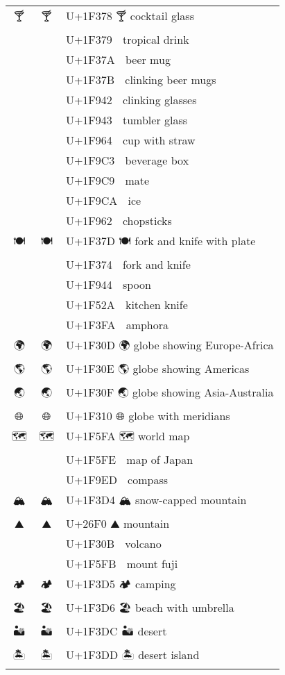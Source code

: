 \documentclass[a4paper,12pt]{article}
\newcommand{\fontA}[1]{{\fontspec[RawFeature={mode=harf,+dist,+ccmp}]{Segoe UI Emoji} #1}}
\newcommand{\fontB}[1]{{\fontspec[RawFeature={mode=harf,+dist,+ccmp}]{Noto Color Emoji} #1}}
\begin{document}
\begin{longtable}[c]{ccp{0.8\linewidth}}
\fontA{🍸}&\fontB{🍸}&U+1F378 🍸 cocktail glass\\
\fontA{🍹}&\fontB{🍹}&U+1F379 🍹 tropical drink\\
\fontA{🍺}&\fontB{🍺}&U+1F37A 🍺 beer mug\\
\fontA{🍻}&\fontB{🍻}&U+1F37B 🍻 clinking beer mugs\\
\fontA{🥂}&\fontB{🥂}&U+1F942 🥂 clinking glasses\\
\fontA{🥃}&\fontB{🥃}&U+1F943 🥃 tumbler glass\\
\fontA{🥤}&\fontB{🥤}&U+1F964 🥤 cup with straw\\
\fontA{🧃}&\fontB{🧃}&U+1F9C3 🧃 beverage box\\
\fontA{🧉}&\fontB{🧉}&U+1F9C9 🧉 mate\\
\fontA{🧊}&\fontB{🧊}&U+1F9CA 🧊 ice\\
\fontA{🥢}&\fontB{🥢}&U+1F962 🥢 chopsticks\\
\fontA{🍽}&\fontB{🍽}&U+1F37D 🍽 fork and knife with plate\\
\fontA{🍴}&\fontB{🍴}&U+1F374 🍴 fork and knife\\
\fontA{🥄}&\fontB{🥄}&U+1F944 🥄 spoon\\
\fontA{🔪}&\fontB{🔪}&U+1F52A 🔪 kitchen knife\\
\fontA{🏺}&\fontB{🏺}&U+1F3FA 🏺 amphora\\
\fontA{🌍}&\fontB{🌍}&U+1F30D 🌍 globe showing Europe-Africa\\
\fontA{🌎}&\fontB{🌎}&U+1F30E 🌎 globe showing Americas\\
\fontA{🌏}&\fontB{🌏}&U+1F30F 🌏 globe showing Asia-Australia\\
\fontA{🌐}&\fontB{🌐}&U+1F310 🌐 globe with meridians\\
\fontA{🗺}&\fontB{🗺}&U+1F5FA 🗺 world map\\
\fontA{🗾}&\fontB{🗾}&U+1F5FE 🗾 map of Japan\\
\fontA{🧭}&\fontB{🧭}&U+1F9ED 🧭 compass\\
\fontA{🏔}&\fontB{🏔}&U+1F3D4 🏔 snow-capped mountain\\
\fontA{⛰}&\fontB{⛰}&U+26F0 ⛰ mountain\\
\fontA{🌋}&\fontB{🌋}&U+1F30B 🌋 volcano\\
\fontA{🗻}&\fontB{🗻}&U+1F5FB 🗻 mount fuji\\
\fontA{🏕}&\fontB{🏕}&U+1F3D5 🏕 camping\\
\fontA{🏖}&\fontB{🏖}&U+1F3D6 🏖 beach with umbrella\\
\fontA{🏜}&\fontB{🏜}&U+1F3DC 🏜 desert\\
\fontA{🏝}&\fontB{🏝}&U+1F3DD 🏝 desert island\\

\end{longtable}
\end{document}
